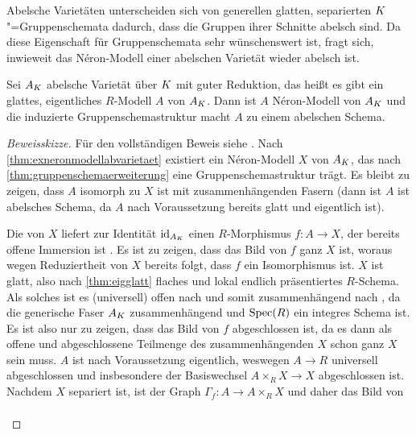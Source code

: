 Abelsche Varietäten unterscheiden sich von generellen glatten,
separierten $K$"=Gruppenschemata dadurch, dass die Gruppen ihrer
Schnitte abelsch sind. Da diese Eigenschaft für Gruppenschemata
sehr wünschenswert ist, fragt sich, inwieweit das Néron-Modell einer
abelschen Varietät wieder abelsch ist. 
\begin{Satz}\label{thm:abelscheneronmodelle}
  Sei $A_{K}$ abelsche Varietät über $K$ mit guter Reduktion,
  das heißt es gibt ein glattes, eigentliches $R$-Modell $A$ von $A_{K}$.
  Dann ist $A$ Néron-Modell von $A_{K}$ und die induzierte
  Gruppenschemastruktur macht $A$ zu einem abelschen Schema.
  \begin{proof}[Beweisskizze] Für den vollständigen Beweis siehe
    \cite[Proposition~1.4/2]{neron}.
    Nach \ref{thm:exneronmodellabvarietaet} existiert ein
    Néron-Modell $X$ von $A_{K}$, das nach
    \ref{thm:gruppenschemaerweiterung} eine Gruppenschemastruktur
    trägt.
    Es bleibt zu zeigen, dass $A$ isomorph zu $X$ ist
    mit zusammenhängenden Fasern (dann ist $A$ ist abelsches Schema,
    da $A$ nach Voraussetzung bereits glatt und eigentlich ist).
    \begin{description}[font=\normalfont\itshape]
    \item[$A$ isomorph zu $X$:]
      Die \NAbbEig von $X$ liefert zur Identität $\mathrm{id}_{A_{K}}$ einen
      $R$-Morphismus $f\colon A\to X$, der bereits offene Immersion ist
      \cite[siehe][4.3/1~(ii) oder 4.4/1]{neron}.
      Es ist zu zeigen, dass das Bild von $f$ ganz $X$ ist, woraus
      wegen Reduziertheit von $X$ bereits folgt, dass $f$ ein
      Isomorphismus ist.
      $X$ ist glatt, also nach
      \ref{thm:eigglatt} flaches und lokal endlich präsentiertes
      $R$-Schema.
      Als solches ist es (universell) offen nach
      \cite[Theorem~14.33]{wedhorn} und somit zusammenhängend nach
      \cite[Proposition~3.24]{wedhorn},
      da die generische Faser $A_{K}$ zusammenhängend und $\operatorname{Spec}(R)$
      ein integres Schema ist.
      Es ist also nur zu zeigen, dass das Bild von $f$ abgeschlossen
      ist, da es dann als offene und abgeschlossene Teilmenge des
      zusammenhängenden $X$ schon ganz $X$ sein muss.
      $A$ ist nach Voraussetzung eigentlich, weswegen ${A\to R}$
      universell abgeschlossen und insbesondere der Basiswechsel
      ${A\times_R X\to X}$ abgeschlossen ist.
      Nachdem $X$ separiert ist, ist der Graph
      ${\Gamma_f\colon A\to A\times_R X}$ und daher das Bild von
      \begin{gather*}

\end{gather*}
\end{description}
\end{proof}
\end{Satz}

